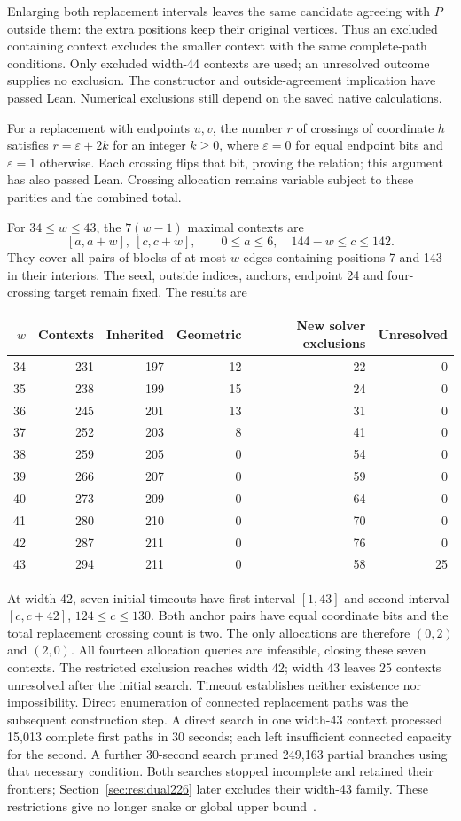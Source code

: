 \documentclass[11pt,a4paper]{article}
\theoremstyle{definition}
\theoremstyle{remark}
\begin{document}
Enlarging both replacement intervals leaves the same candidate agreeing
with $P$ outside them: the extra positions keep their original vertices.
Thus an excluded containing context excludes the smaller context with
the same complete-path conditions. Only excluded width-44 contexts are
used; an unresolved outcome supplies no exclusion. The constructor and
outside-agreement implication have passed Lean. Numerical exclusions
still depend on the saved native calculations.

For a replacement with endpoints $u,v$, the number $r$ of crossings of
coordinate $h$ satisfies $r=\varepsilon+2k$ for an integer $k\ge0$,
where $\varepsilon=0$ for equal endpoint bits and $\varepsilon=1$
otherwise. Each crossing flips that bit, proving the relation; this
argument has also passed Lean. Crossing allocation remains variable
subject to these parities and the combined total.

For $34\le w\le43$, the $7(w-1)$ maximal contexts are
\[
[a,a+w],\ [c,c+w],\qquad0\le a\le6,\quad144-w\le c\le142.
\]
They cover all pairs of blocks of at most $w$ edges containing positions
7 and 143 in their interiors. The seed, outside indices, anchors,
endpoint 24 and four-crossing target remain fixed. The results are
\begin{center}
\begin{tabular}{rrrrrr}
\toprule
$w$&Contexts&Inherited&Geometric&New solver exclusions&Unresolved\\
\midrule
34&231&197&12&22&0\\
35&238&199&15&24&0\\
36&245&201&13&31&0\\
37&252&203&8&41&0\\
38&259&205&0&54&0\\
39&266&207&0&59&0\\
40&273&209&0&64&0\\
41&280&210&0&70&0\\
42&287&211&0&76&0\\
43&294&211&0&58&25\\
\bottomrule
\end{tabular}
\end{center}
At width 42, seven initial timeouts have first interval $[1,43]$ and
second interval $[c,c+42]$, $124\le c\le130$. Both anchor pairs have
equal coordinate bits and the total replacement crossing count is two.
The only allocations are therefore $(0,2)$ and $(2,0)$. All fourteen
allocation queries are infeasible, closing these seven contexts.
The restricted exclusion reaches width 42; width 43 leaves 25
contexts unresolved after the initial search. Timeout establishes
neither existence nor impossibility. Direct enumeration of connected
replacement paths was the subsequent construction step. A direct search in one width-43 context processed 15,013 complete
first paths in 30 seconds; each left insufficient connected capacity
for the second. A further 30-second search pruned 249,163 partial
branches using that necessary condition. Both searches stopped incomplete and retained their frontiers;
Section~\ref{sec:residual226} later excludes their width-43 family. These restrictions give no longer snake or global upper bound~\cite{research225}.
\end{document}
